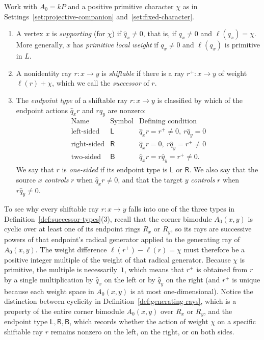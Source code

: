 \begin{definition}
\label{def:successor-types}
Work with $A_0=kP$ and a positive primitive character $\chi$ as in Settings~\ref{set:projective-companion} and~\ref{set:fixed-character}.
\begin{enumerate}[label={\upshape(\arabic*)}]
\item A vertex $x$ is \emph{supporting} (for $\chi$) if $\widehat q_x\ne0$, that is, if $q_x\ne0$ and $\ell(q_x)=\chi$. More generally, $x$ has \emph{primitive local weight} if $q_x\ne0$ and $\ell(q_x)$ is primitive in $L$.
\item A nonidentity ray $r\colon x\to y$ is \emph{shiftable} if there is a ray $r^+\colon x\to y$ of weight $\ell(r)+\chi$, which we call the \emph{successor} of $r$.
\item The \emph{endpoint type} of a shiftable ray $r\colon x\to y$ is classified by which of the endpoint actions $\widehat q_xr$ and $r\widehat q_y$ are nonzero:
\[
\begin{array}{c|c|l}
\text{Name} & \text{Symbol} & \text{Defining condition} \\ \hline
\text{left-sided} & \mathsf L & \widehat q_xr=r^+\ne0,\ r\widehat q_y=0 \\
\text{right-sided} & \mathsf R & \widehat q_xr=0,\ r\widehat q_y=r^+\ne0 \\
\text{two-sided} & \mathsf B & \widehat q_xr=r\widehat q_y=r^+\ne0.
\end{array}
\]
We say that $r$ is \emph{one-sided} if its endpoint type is $\mathsf L$ or $\mathsf R$. We also say that the source $x$ \emph{controls} $r$ when $\widehat q_xr\ne0$, and that the target $y$ \emph{controls} $r$ when $r\widehat q_y\ne0$.
\end{enumerate}
\end{definition}

To see why every shiftable ray $r\colon x\to y$ falls into one of the three types in Definition~\ref{def:successor-types}(3), recall that the corner bimodule $A_0(x,y)$ is cyclic over at least one of its endpoint rings $R_x$ or $R_y$, so its rays are successive powers of that endpoint's radical generator applied to the generating ray of $A_0(x,y)$. The weight difference $\ell(r^+)-\ell(r)=\chi$ must therefore be a positive integer multiple of the weight of that radical generator. Because $\chi$ is primitive, the multiple is necessarily~$1$, which means that $r^+$ is obtained from $r$ by a single multiplication by $\widehat q_x$ on the left or by $\widehat q_y$ on the right (and $r^+$ is unique because each weight space in $A_0(x,y)$ is at most one-dimensional). Notice the distinction between cyclicity in Definition~\ref{def:generating-rays}, which is a property of the entire corner bimodule $A_0(x,y)$ over $R_x$ or $R_y$, and the endpoint type $\mathsf L,\mathsf R,\mathsf B$, which records whether the action of weight $\chi$ on a specific shiftable ray $r$ remains nonzero on the left, on the right, or on both sides.

